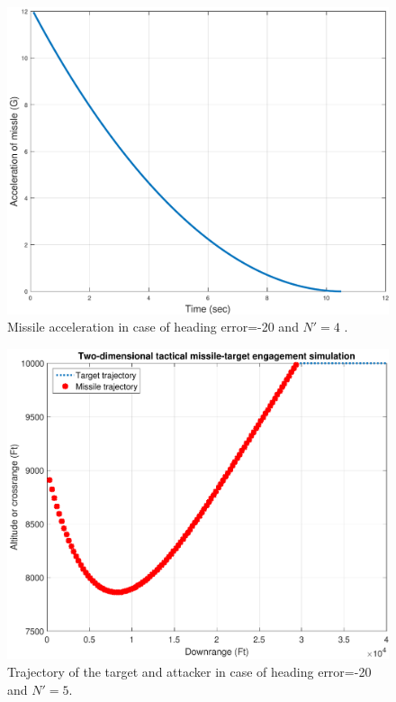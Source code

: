 \begin{figure}[htb]
	\centering
	\includegraphics[scale = 0.75]{fig/MissileAcceleration20N4.pdf}
	\caption{Missile acceleration in case of heading error=-20 and $N'=4$ .}
	\label{missile acceleration20N4}
\end{figure}


\begin{figure}[htb]
	\centering
	\includegraphics[scale = 0.75]{fig/trajectory20N5.pdf}
	\caption{Trajectory of the target and attacker in case of heading error=-20 and $N'=5$.}
	\label{trajectory20N5}
\end{figure}



